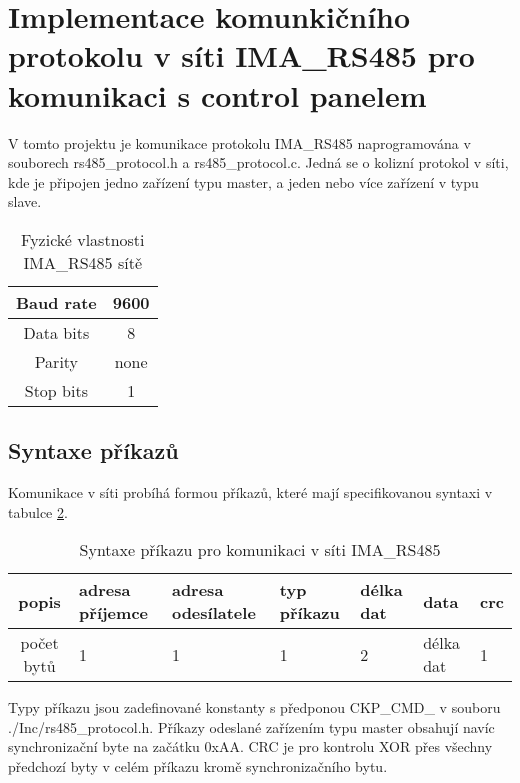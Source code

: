 \section{Implementace komunkičního protokolu v síti IMA\_RS485 pro komunikaci s control panelem}
V tomto projektu je komunikace protokolu IMA\_RS485 naprogramována v souborech rs485\_protocol.h a rs485\_protocol.c. 
Jedná se o kolizní protokol v síti, kde je připojen jedno zařízení typu master, a jeden nebo více zařízení v typu slave.

\begin{table}[!h]
    \centering
    \begin{tabular}{ |c|c| }
     \hline

     Baud rate              & 9600           \\ \hline
     Data bits              & 8                 \\ \hline
     Parity                 & none              \\ \hline
     Stop bits              & 1                 \\ \hline

    \end{tabular}
    \caption{Fyzické vlastnosti IMA\_RS485 sítě}
    \label{table:3}
\end{table}

\newpage
\subsection{Syntaxe příkazů}
Komunikace v síti probíhá formou příkazů, které mají specifikovanou syntaxi v tabulce \ref{table:syntaxePrikazu}.

\begin{table}[!h]
    \centering
\begin{tabular}{ |c|| p{1.5cm} | p{1.5cm} | p{1cm} | p{1cm} | p{1cm} | p{1cm} | }
 \hline
 popis      & adresa příjemce & adresa odesílatele & typ příkazu & délka dat & data & crc\\ \hline
 počet bytů & 1               & 1   & 1     & 2     & délka dat     & 1 \\ 
 \hline
\end{tabular}
    \caption{Syntaxe příkazu pro komunikaci v síti IMA\_RS485}
    \label{table:syntaxePrikazu}
\end{table}

Typy příkazu jsou zadefinované konstanty s předponou CKP\_CMD\_ v souboru ./Inc/rs485\_protocol.h.
Příkazy odeslané zařízením typu master obsahují navíc synchronizační byte na začátku 0xAA.
CRC je pro kontrolu XOR přes všechny předchozí byty v celém příkazu kromě synchronizačního bytu.

